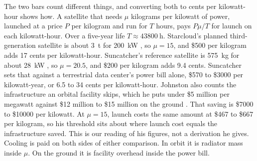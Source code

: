 \documentclass{article}
\begin{document}
The two bars count different things, and converting both to cents per kilowatt-hour shows how. A satellite that needs $\mu$ kilograms per kilowatt of power, launched at a price $P$ per kilogram and run for $T$ hours, pays $P\mu/T$ for launch on each kilowatt-hour. Over a five-year life $T \approx \SI{43800}{\hour}$. Starcloud's planned third-generation satellite is about \SI{3}{\tonne} for \SI{200}{\kilo\watt} \cite{bennici2026_johnston}, so $\mu = 15$, and \$500 per kilogram adds 17 cents per kilowatt-hour. Suncatcher's reference satellite is \SI{575}{\kilo\gram} for about \SI{28}{\kilo\watt} \cite{aguera2026_suncatcher}, so $\mu = 20.5$, and \$200 per kilogram adds 9.4 cents. Suncatcher sets that against a terrestrial data center's power bill alone, \$570 to \$3000 per kilowatt-year, or 6.5 to 34 cents per kilowatt-hour. Johnston also counts the infrastructure an orbital facility skips, which he puts under \$5 million per megawatt against \$12 million to \$15 million on the ground \cite{bennici2026_johnston}. That saving is \$7000 to \$10000 per kilowatt. At $\mu = 15$, launch costs the same amount at \$467 to \$667 per kilogram, so his threshold sits about where launch cost equals the infrastructure saved. This is our reading of his figures, not a derivation he gives. Cooling is paid on both sides of either comparison. In orbit it is radiator mass inside $\mu$. On the ground it is facility overhead inside the power bill.
\end{document}
